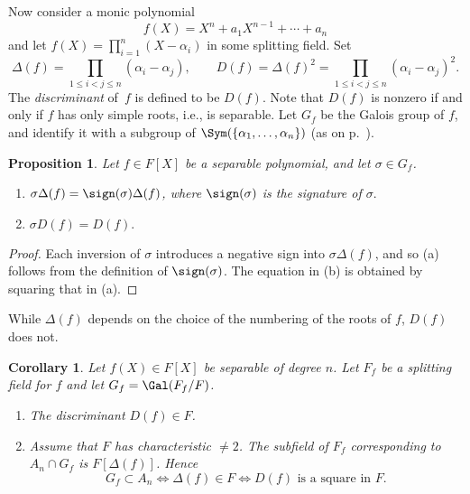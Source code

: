 \documentclass[a4paper,11pt,final,openany]{memoir}
\newtheorem{corollary}[X]{Corollary}
\newtheorem{proposition}[X]{Proposition}
\theoremstyle{nonumberplain}
\newtheorem{proof}{Proof.}
\begin{document}
Now consider a monic polynomial
\[
f(X)=X^{n}+a_{1}X^{n-1}+\cdots+a_{n}%
\]
and let $f(X)=\prod_{i=1}^{n}(X-\alpha_{i})$ in some splitting field. Set
\[
\Delta(f)=\prod_{1\leq i<j\leq n}(\alpha_{i}-\alpha_{j}),\qquad D(f)=\Delta
(f)^{2}=\prod_{1\leq i<j\leq n}(\alpha_{i}-\alpha_{j})^{2}.
\]
The \emph{discriminant }%
%
of\emph{\ }$f$ is defined to be $D(f)$. Note that $D(f)$ is nonzero if and
only if $f$ has only simple roots, i.e., is separable. Let $G_{f}$ be the
Galois group of $f$, and identify it with a subgroup of $\Sym(\{\alpha
_{1},\ldots,\alpha_{n}\})$ (as on p.~\pageref{ggp}).

\begin{proposition}
\label{cg1}Let $f\in F[X]$ be a separable polynomial, and let $\sigma\in
G_{f}$.

\begin{enumerate}
\item $\sigma\Delta(f)=\sign(\sigma)\Delta(f)$, where $\sign(\sigma)$ is the
signature of $\sigma.$

\item $\sigma D(f)=D(f).$
\end{enumerate}
\end{proposition}

\begin{proof}
Each inversion of $\sigma$ introduces a negative sign into $\sigma\Delta(f)$,
and so (a) follows from the definition of $\sign(\sigma)$. The equation in (b)
is obtained by squaring that in (a).
\end{proof}

While $\Delta(f)$ depends on the choice of the numbering of the roots of $f$,
$D(f)$ does not.

\begin{corollary}
\label{cg2}Let $f(X)\in F[X]$ be separable of degree $n$. Let $F_{f}$ be a
splitting field for $f$ and let $G_{f}=\Gal(F_{f}/F)$.

\begin{enumerate}
\item The discriminant $D(f)\in F$.

\item Assume that $F$ has characteristic $\neq 2$. The subfield of $F_{f}$ corresponding to $A_{n}\cap G_{f}$ is
$F[\Delta(f)]$. Hence
\[
G_{f}\subset A_{n}\iff\Delta(f)\in F\iff D(f)\text{\ is a square in }F.
\]

\end{enumerate}
\end{corollary}
\end{document}
